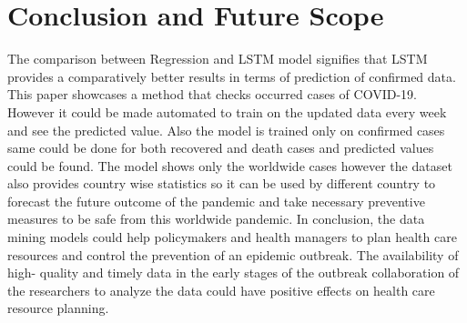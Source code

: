 \pagebreak
\section{Conclusion and Future Scope}

The comparison between Regression and LSTM model signifies that LSTM provides a
comparatively better results in terms of prediction of confirmed data. This paper showcases a method that checks occurred cases of
COVID-19. However it could be made automated to train on the updated data
every week and see the predicted value. Also the model is trained only on confirmed cases
same could be done for both recovered and death cases and predicted values could be found.
The model shows only the worldwide cases however the dataset also provides country wise
statistics so it can be used by different country to forecast the future outcome of the
pandemic and take necessary preventive measures to be safe from this worldwide
pandemic.  In conclusion,
the data mining models could help policymakers and health managers to plan health care
resources and control the prevention of an epidemic outbreak. The availability of high-
quality and timely data in the early stages of the outbreak collaboration of
the researchers to analyze the data could have positive effects on health care
resource planning.

